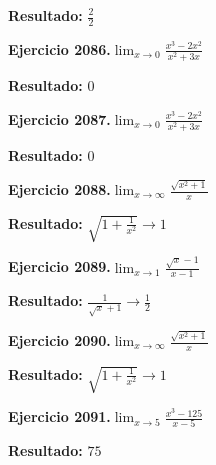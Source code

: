 \documentclass[10pt,a4paper]{article}
\begin{document}
\begin{solbox}
\textbf{Resultado:} \(\displaystyle \frac{2}{2}\)
\end{solbox}

\begin{ejbox}
\textbf{Ejercicio 2086.}\quad $\lim_{x\to 0} \frac{x^3-2x^2}{x^2+3x}$
\end{ejbox}

\begin{solbox}
\textbf{Resultado:} \(\displaystyle 0\)
\end{solbox}

\newpage
\begin{ejbox}
\textbf{Ejercicio 2087.}\quad $\lim_{x\to 0} \frac{x^3-2x^2}{x^2+3x}$
\end{ejbox}

\begin{solbox}
\textbf{Resultado:} \(\displaystyle 0\)
\end{solbox}

\begin{ejbox}
\textbf{Ejercicio 2088.}\quad $\lim_{x\to \infty} \frac{\sqrt{x^2+1}}{x}$
\end{ejbox}

\begin{solbox}
\textbf{Resultado:} \(\displaystyle \sqrt{1+\frac{1}{x^2}} \to 1\)
\end{solbox}

\begin{ejbox}
\textbf{Ejercicio 2089.}\quad $\lim_{x\to 1} \frac{\sqrt{x}-1}{x-1}$
\end{ejbox}

\begin{solbox}
\textbf{Resultado:} \(\displaystyle \frac{1}{\sqrt{x}+1} \to \frac{1}{2}\)
\end{solbox}

\newpage
\begin{ejbox}
\textbf{Ejercicio 2090.}\quad $\lim_{x\to \infty} \frac{\sqrt{x^2+1}}{x}$
\end{ejbox}

\begin{solbox}
\textbf{Resultado:} \(\displaystyle \sqrt{1+\frac{1}{x^2}} \to 1\)
\end{solbox}

\begin{ejbox}
\textbf{Ejercicio 2091.}\quad $\lim_{x\to 5} \frac{x^3-125}{x-5}$
\end{ejbox}

\begin{solbox}
\textbf{Resultado:} \(\displaystyle 75\)
\end{solbox}
\end{document}

